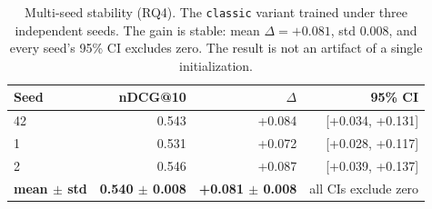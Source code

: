 \begin{table}[t]
\centering
\caption{Multi-seed stability (RQ4). The \texttt{classic} variant trained under three independent seeds. The gain is stable: mean $\Delta{=}{+}0.081$, std $0.008$, and every seed's 95\% CI excludes zero. The result is not an artifact of a single initialization.}
\label{tab:seed}
\begin{tabular}{lrrr}
\toprule
Seed & nDCG@10 & $\Delta$ & 95\% CI \\
\midrule
42 & 0.543 & +0.084 & [+0.034, +0.131] \\
1  & 0.531 & +0.072 & [+0.028, +0.117] \\
2  & 0.546 & +0.087 & [+0.039, +0.137] \\
\midrule
\textbf{mean $\pm$ std} & \textbf{0.540 $\pm$ 0.008} & \textbf{+0.081 $\pm$ 0.008} & all CIs exclude zero \\
\bottomrule
\end{tabular}
\end{table}
